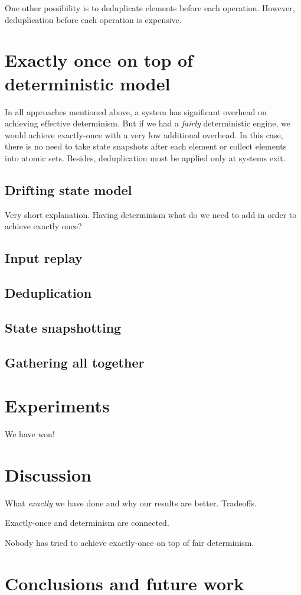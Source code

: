 \documentclass[sigconf]{acmart}
\theoremstyle{remark}
\begin{document}
One other possibility is to deduplicate elements before each operation. However, deduplication before each operation is expensive.

\section{Exactly once on top of deterministic model}

In all approaches mentioned above, a system has significant overhead on achieving effective determinism. But if we had a {\em fairly} deterministic engine, we would achieve exactly-once with a very low additional overhead. In this case, there is no need to take state snapshots after each element or collect elements into atomic sets. Besides, deduplication must be applied only at systems exit.

\subsection{Drifting state model}

Very short explanation. Having determinism what do we need to add in order to achieve exactly once?

\subsection{Input replay}

\subsection{Deduplication}

\subsection{State snapshotting}

\subsection{Gathering all together}

\section{Experiments}

We have won!

\section{Discussion}

What {\em exactly} we have done and why our results are better. Tradeoffs.

Exactly-once and determinism are connected.

Nobody has tried to achieve exactly-once on top of fair determinism.

\section{Conclusions and future work}




\end{document}
